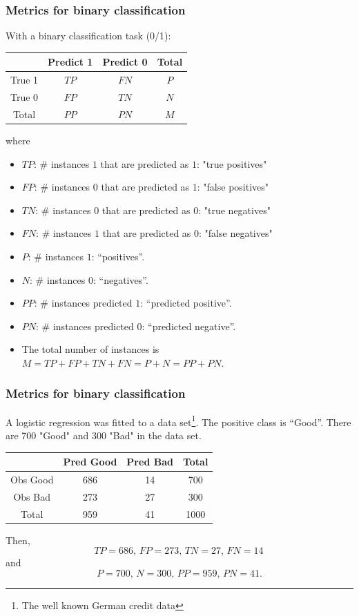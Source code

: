 \begin{frame}
\frametitle{Metrics for binary classification}
With a binary classification task (0/1):
\begin{center}
\begin{tabular}{|c|c|c||c|}
\hline
& Predict 1 & Predict 0 & Total \\
\hline
True 1 & $TP$ & $FN$ & $P$\\
\hline
True 0 & $FP$ & $TN$ & $N$ \\
\hline
\hline
Total & $PP$ & $PN$ & $M$\\
\hline
\end{tabular}
\end{center}
where\\
\scriptsize
\begin{itemize}
\item $TP$: $\#$ instances $1$ that are predicted as $1$: "true positives"
\item $FP$: $\#$ instances $0$ that are predicted as $1$: "false positives"
\item $TN$: $\#$ instances $0$ that are predicted as $0$: "true negatives"
\item $FN$: $\#$ instances $1$ that are predicted as $0$: "false negatives"
\item $P$: $\#$ instances $1$: ``positives''.
\item $N$: $\#$ instances $0$: ``negatives''.
\item $PP$: $\#$ instances predicted $1$: ``predicted positive''.
\item $PN$: $\#$ instances predicted $0$: ``predicted negative''.
\item The total number of instances is $M=TP+FP+TN+FN=P+N=PP+PN$.
\end{itemize}
\end{frame}
\begin{frame}[fragile]
\frametitle{Metrics for binary classification}
A logistic regression was fitted to a data set\footnote{The well known German credit data}. The positive class is ``Good''. There are 700 "Good" and 300 "Bad" in the data set.
\begin{center}
\begin{tabular}{c|c|c||c}
& Pred Good & Pred Bad & Total\\
\hline
Obs Good  & 686 & 14 & 700\\
\hline
Obs Bad   & 273 & 27 & 300\\
\hline\hline
 Total & 959 & 41 & 1000
\end{tabular}
\end{center}
Then,
$$
TP=686, \, FP=273, \, TN=27, \, FN=14\,
$$
and
$$
P=700, \, N=300, \, PP=959, \, PN=41.
$$
\end{frame}
